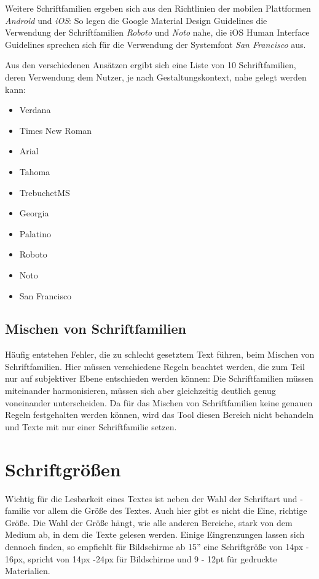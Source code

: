 Weitere Schriftfamilien ergeben sich aus den Richtlinien der mobilen Plattformen \textit{Android} und \textit{iOS}: So legen die Google Material Design Guidelines die Verwendung der Schriftfamilien \textit{Roboto} und \textit{Noto} nahe, die iOS Human Interface Guidelines sprechen sich für die Verwendung der Systemfont \textit{San Francisco} aus.

Aus den verschiedenen Ansätzen ergibt sich eine Liste von 10 Schriftfamilien, deren Verwendung dem Nutzer, je nach Gestaltungskontext, nahe gelegt werden kann:

\begin{itemize}
	\item Verdana
	\item Times New Roman
	\item Arial
	\item Tahoma
	\item TrebuchetMS
	\item Georgia
	\item Palatino
	\item Roboto
	\item Noto
	\item San Francisco
\end{itemize}

\subsection{Mischen von Schriftfamilien}

Häufig entstehen Fehler, die zu schlecht gesetztem Text führen, beim Mischen von Schriftfamilien. Hier müssen verschiedene Regeln beachtet werden, die zum Teil nur auf subjektiver Ebene entschieden werden können: Die Schriftfamilien müssen miteinander harmonisieren, müssen sich aber gleichzeitig deutlich genug voneinander unterscheiden. Da für das Mischen von Schriftfamilien keine genauen Regeln festgehalten werden können, wird das Tool diesen Bereich nicht behandeln und Texte mit nur einer Schriftfamilie setzen.


\section{Schriftgrößen}
Wichtig für die Lesbarkeit eines Textes ist neben der Wahl der Schriftart und -familie vor allem die Größe des Textes. Auch hier gibt es nicht die Eine, richtige Größe. Die Wahl der Größe hängt, wie alle anderen Bereiche, stark von dem Medium ab, in dem die Texte gelesen werden.
Einige Eingrenzungen lassen sich dennoch finden, so empfiehlt \cite{Runk200804} für Bildschirme ab 15” eine Schriftgröße von 14px - 16px, \cite{Lehnert201602} spricht von 14px -24px für Bildschirme und 9 - 12pt für gedruckte Materialien.

